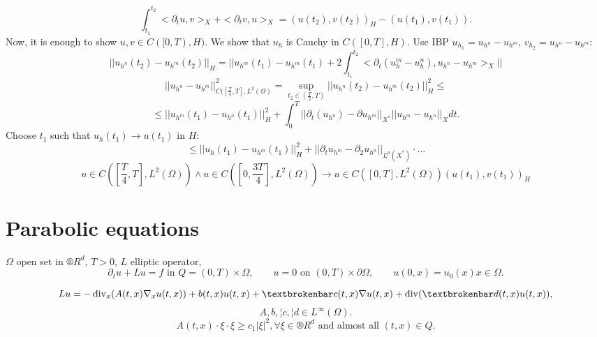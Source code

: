 \documentclass[12pt]{article}					%
\begin{document}
\begin{veta}
\begin{dukazin}[„Step 3)“]
		$$ \int_{t_1}^{t_2} <\partial_t u, v>_X + <\partial_t v, u>_X = (u(t_2), v(t_2))_H - (u(t_1), v(t_1)). $$
		Now, it is enough to show $u, v \in C([0, T), H)$. We show that $u_h$ is Cauchy in $C([0, T], H)$. Use IBP $u_{h_1} = u_{h^n} - u_{h^m}$, $v_{h_2} = u_{h^n} - u_{h^m}$:
		$$ ||u_{h^n}(t_2) - u_{h^m}(t_2)||_H = ||u_{h^m}(t_1) - u_{h^m}(t_1) + 2 \int_{t_1}^{t_2}<\partial_t(u_h^m - u_h^n), u_{h^n} - u_{h^m}>_X|| $$
		$$ ||u_{h^n} - u_{h^m}||^2_{C([\frac{T}{4}, T], L^2(\Omega)} = \sup_{t_2 \in (\frac{T}{2}, T)} ||u_{h^n}(t_2) - u_{h^m}(t_2)||_H^2 ≤ $$
		$$ ≤ ||u_{h^m}(t_1) - u_{h^n}(t_1)||_H^2 + \int_0^T || \partial_t(u_{h^n}) - \partial u_{h^m}||_{X^*} ||u_{h^m} - u_{h^n}||_X dt. $$
		Choose $t_1$ such that $u_h(t_1) \rightarrow u(t_1)$ in $H$:
		$$ ≤ ||u_h(t_1) - u_{h^m}(t_1)||_H^2 + ||\partial_t u_{h^m} - \partial_2 u_{h^n}||_{L^p(X^*)} · … $$
		$$ u \in C([\frac{T}{4}, T], L^2(\Omega)) \land u \in C([0, \frac{3T}{4}], L^2(\Omega)) \rightarrow u \in C([0, T], L^2(\Omega))(u(t_1), v(t_1))_H $$
	\end{dukazin}
\end{veta}

\section{Parabolic equations}
\begin{poznamka}
	$\Omega$ open set in $®R^d$, $T > 0$, $L$ elliptic operator,
	$$ \partial_t u + L u = f \text{ in } Q = (0, T) \times \Omega, \qquad u = 0 \text{ on } (0, T) \times \partial \Omega, \qquad u(0, x) = u_0(x) x \in \Omega. $$

	$$ Lu = - \Div_x(A(t, x) \nabla_x u(t, x)) + b(t, x) u(t, x) + ¦c(t, x) \nabla u(t, x) + \Div(¦d(t, x) u(t, x)), $$
	$$ A, b, ¦c, ¦d \in L^∞(\Omega). $$
	$$ A(t, x)·\xi·\xi ≥ c_1 |\xi|^2, \forall \xi \in ®R^d \text{ and almost all } (t, x) \in Q. $$
\end{poznamka}
\end{document}
